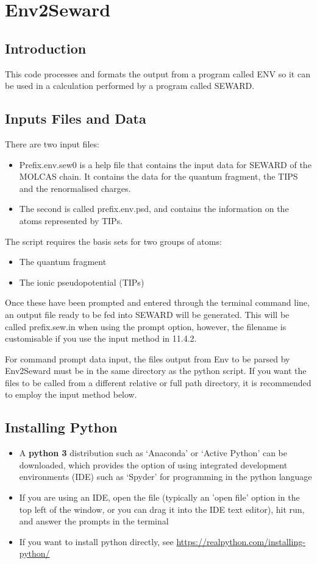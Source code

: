 \section{Env2Seward}
\subsection{Introduction}

This code processes and formats the output from a program called ENV so it can be used in a calculation performed by a program called SEWARD.

\subsection{Inputs Files and Data}
There are two input files:

\begin{itemize}
	\item Prefix.env.sew0 is a help file that contains the input data for SEWARD of the MOLCAS chain. It contains the data for the quantum fragment, the TIPS and the renormalised charges.
	\item The second is called prefix.env.psd, and contains the information on the atoms represented by TIPs.
\end{itemize}

The script requires the basis sets for two groups of atoms: 
\begin{itemize}
	\item The quantum fragment
	\item The ionic pseudopotential (TIPs)
\end{itemize}

Once these have been prompted and entered through the terminal command line, an output file ready to be fed into SEWARD will be generated. This will be called prefix.sew.in when using the prompt option, however, the filename is customisable if you use the input method in 11.4.2.

For command prompt data input, the files output from Env to be parsed by Env2Seward must be in the same directory as the python script. If you want the files to be called from a different relative or full path directory, it is recommended to employ the input method below.

\subsection{Installing Python}
\begin{itemize}
	\item A {\bf python 3} distribution such as `Anaconda' or `Active Python' can be downloaded, which provides the option of using integrated development environments (IDE) such as `Spyder' for programming in the python language
	\item If you are using an IDE, open the file (typically an 'open file' option in the top left of the window, or you can drag it into the IDE text editor), hit run, and answer the prompts in the terminal
	\item If you want to install python directly, see \url{https://realpython.com/installing-python/}
\end{itemize}

